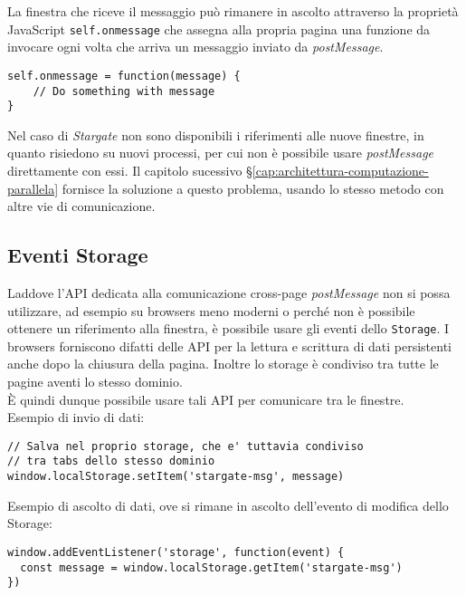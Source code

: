 La finestra che riceve il messaggio può rimanere in ascolto attraverso la proprietà JavaScript \texttt{self.onmessage} che assegna alla propria pagina una funzione da invocare ogni volta che arriva un messaggio inviato da \textit{postMessage}. \\

\vfill

\begin{lstlisting}[language={[Sharp]C}]
self.onmessage = function(message) {
    // Do something with message
}
\end{lstlisting}

Nel caso di \textit{Stargate} non sono disponibili i riferimenti alle nuove finestre, in quanto risiedono su nuovi processi, per cui non è possibile usare \textit{postMessage} direttamente con essi. Il capitolo sucessivo §\ref{cap:architettura-computazione-parallela} fornisce la soluzione a questo problema, usando lo stesso metodo con altre vie di comunicazione.

\subsection{Eventi Storage}

Laddove l'API dedicata alla comunicazione cross-page \textit{postMessage} non si possa utilizzare, ad esempio su browsers meno moderni o perché non è possibile ottenere un riferimento alla finestra, è possibile usare gli eventi dello \texttt{Storage}. I browsers forniscono difatti delle API per la lettura e scrittura di dati persistenti anche dopo la chiusura della pagina. Inoltre lo storage è condiviso tra tutte le pagine aventi lo stesso dominio. \\

È quindi dunque possibile usare tali API per comunicare tra le finestre. \\

Esempio di invio di dati:

\begin{lstlisting}[language={[Sharp]C}]
// Salva nel proprio storage, che e' tuttavia condiviso
// tra tabs dello stesso dominio
window.localStorage.setItem('stargate-msg', message)
\end{lstlisting}

Esempio di ascolto di dati, ove si rimane in ascolto dell'evento di modifica dello Storage:

\begin{lstlisting}[language={[Sharp]C}]
window.addEventListener('storage', function(event) {
  const message = window.localStorage.getItem('stargate-msg')
})
\end{lstlisting}

